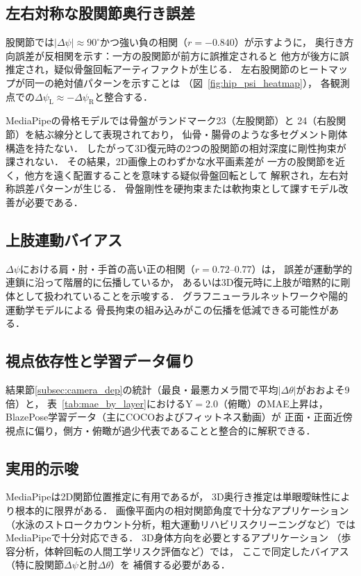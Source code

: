 \documentclass[fleqn]{ieej}
\begin{document}
\subsection{左右対称な股関節奥行き誤差}

股関節では$|\Delta\psi|\approx90^{\circ}$かつ強い負の相関（$r=-0.840$）が示すように，
奥行き方向誤差が反相関を示す：一方の股関節が前方に誤推定されると
他方が後方に誤推定され，疑似骨盤回転アーティファクトが生じる．
左右股関節のヒートマップが同一の絶対値パターンを示すことは
（図~\ref{fig:hip_psi_heatmap}），
各観測点での$\Delta\psi_{\text{L}} \approx -\Delta\psi_{\text{R}}$と整合する．

MediaPipeの骨格モデルでは骨盤がランドマーク23（左股関節）と
24（右股関節）を結ぶ線分として表現されており，
仙骨・腸骨のような多セグメント剛体構造を持たない．
したがって3D復元時の2つの股関節の相対深度に剛性拘束が課されない．
その結果，2D画像上のわずかな水平画素差が
一方の股関節を近く，他方を遠く配置することを意味する疑似骨盤回転として
解釈され，左右対称誤差パターンが生じる．
骨盤剛性を硬拘束または軟拘束として課すモデル改善が必要である．

\subsection{上肢連動バイアス}

$\Delta\psi$における肩・肘・手首の高い正の相関（$r=0.72$--$0.77$）は，
誤差が運動学的連鎖に沿って階層的に伝播しているか，
あるいは3D復元時に上肢が暗黙的に剛体として扱われていることを示唆する．
グラフニューラルネットワークや陽的運動学モデルによる
骨長拘束の組み込みがこの伝播を低減できる可能性がある．

\subsection{視点依存性と学習データ偏り}

結果節\ref{subsec:camera_dep}の統計（最良・最悪カメラ間で平均$|\Delta\theta|$がおおよそ9倍）と，
表~\ref{tab:mae_by_layer}におけるY$=$2.0（俯瞰）のMAE上昇は，
BlazePose学習データ（主にCOCO\cite{coco}およびフィットネス動画\cite{blazepose}）が
正面・正面近傍視点に偏り，側方・俯瞰が過少代表であることと整合的に解釈できる．

\subsection{実用的示唆}

MediaPipeは2D関節位置推定に有用であるが，
3D奥行き推定は単眼曖昧性により根本的に限界がある．
画像平面内の相対関節角度で十分なアプリケーション
（水泳のストロークカウント分析，粗大運動リハビリスクリーニングなど）では
MediaPipeで十分対応できる．
3D身体方向を必要とするアプリケーション
（歩容分析，体幹回転の人間工学リスク評価など）では，
ここで同定したバイアス（特に股関節$\Delta\psi$と肘$\Delta\theta$）を
補償する必要がある．
\end{document}
